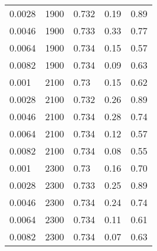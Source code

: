 \begin{table}[tbp]
\begin{center}
\begin{tabular}{lllll}
\num{0,0028} & \num{1900} & \num{0,732} & \num{0,19} & \num{0,89}\\
\num{0,0046} & \num{1900} & \num{0,733} & \num{0,33} & \num{0,77}\\
\num{0,0064} & \num{1900} & \num{0,734} & \num{0,15} & \num{0,57}\\
\num{0,0082} & \num{1900} & \num{0,734} & \num{0,09} & \num{0,63}\\
\num{0,001}  & \num{2100} & \num{0,73}  & \num{0,15} & \num{0,62}\\
\num{0,0028} & \num{2100} & \num{0,732} & \num{0,26} & \num{0,89}\\
\num{0,0046} & \num{2100} & \num{0,734} & \num{0,28} & \num{0,74}\\
\num{0,0064} & \num{2100} & \num{0,734} & \num{0,12} & \num{0,57}\\
\num{0,0082} & \num{2100} & \num{0,734} & \num{0,08} & \num{0,55}\\
\num{0,001}  & \num{2300} & \num{0,73}  & \num{0,16} & \num{0,70}\\
\num{0,0028} & \num{2300} & \num{0,733} & \num{0,25} & \num{0,89}\\
\num{0,0046} & \num{2300} & \num{0,734} & \num{0,24} & \num{0,74}\\
\num{0,0064} & \num{2300} & \num{0,734} & \num{0,11} & \num{0,61}\\
\num{0,0082} & \num{2300} & \num{0,734} & \num{0,07} & \num{0,63}\\
  \hline
  \end{tabular}
  \end{center}
\end{table}

